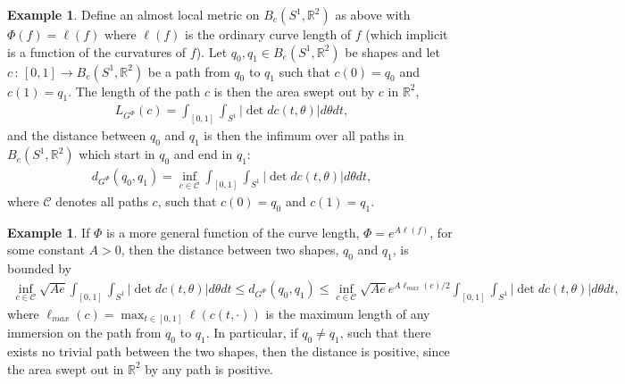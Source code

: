 \documentclass[a4,danish]{article}
\theoremstyle{break}
\theoremstyle{definition}
\theoremstyle{Break}
\newtheorem{example}[subsection]{Example}
\newcommand{\R}{\mathbb{R}}
\begin{document}
\begin{example}
Define an almost local metric on $B_e(S^1, \R^2)$ as above with $\Phi(f) = \ell(f)$ where $\ell(f)$ is the ordinary curve length of $f$ (which implicit is a function of the curvatures of $f$). Let $q_0, q_1 \in B_e(S^1, \R^2)$ be shapes and let $c \, : \, [0,1] \rightarrow B_e(S^1, \R^2)$ be a path from $q_0$ to $q_1$ such that $c(0) = q_0$ and $c(1) = q_1$. The length of the path $c$ is then the area swept out by $c$ in $\R^2$,
\begin{align*}
L_{G^\Phi}(c) = \int_{[0,1]} \int_{S^1} \left| \det dc(t, \theta) \right| d\theta dt,
\end{align*}
and the distance between $q_0$ and $q_1$ is then the infimum over all paths in $B_e(S^1, \R^2)$ which start in $q_0$ and end in $q_1$:
\begin{align*}
d_{G^\Phi}(q_0, q_1) = \inf_{c\in\mathcal{C}} \int_{[0,1]} \int_{S^1} \left| \det dc(t, \theta) \right| d\theta dt,
\end{align*}
where $\mathcal{C}$ denotes all paths $c$, such that $c(0) =q_0$ and $c(1) =q_1$. \\[0.2 cm]
\end{example}

\begin{example}
If $\Phi$ is a more general function of the curve length, $\Phi = e^{A \ell (f)}$, for some constant $A > 0$, then the distance between two shapes, $q_0$ and $q_1$, is bounded by
\begin{align*}
\inf_{c\in\mathcal{C}} \sqrt{A e} \int_{[0,1]} \int_{S^1} \left| \det dc(t, \theta) \right| d\theta dt \leq d_{G^\Phi}(q_0, q_1) \leq \inf_{c\in\mathcal{C}} \sqrt{A e} e^{A \ell_{max}(c) / 2} \int_{[0,1]} \int_{S^1} \left| \det dc(t, \theta) \right| d\theta dt,
\end{align*}
where $\ell_{max} (c) = \max_{t \in [0,1]} \ell (c(t, \cdot))$ is the maximum length of any immersion on the path from $q_0$ to $q_1$. In particular, if $q_0 \neq q_1$, such that there exists no trivial path between the two shapes, then the distance is positive, since the area swept out in $\R^2$ by any path is positive. 
\end{example}
\end{document}
